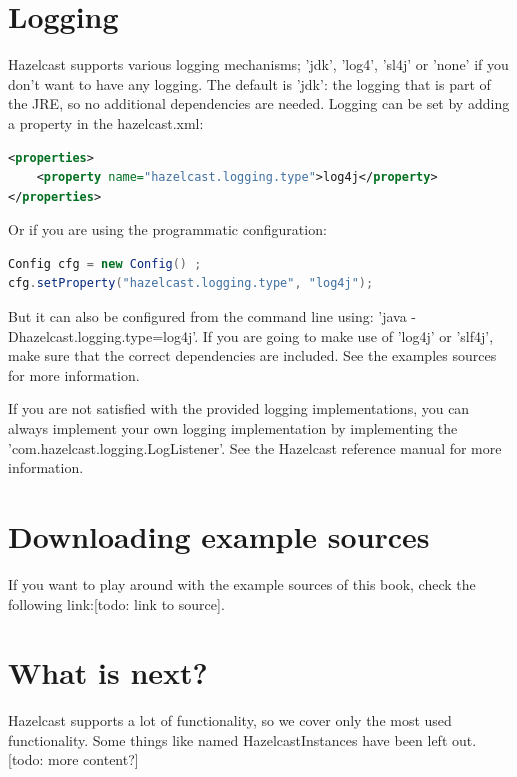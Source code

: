 \section{Logging}
Hazelcast supports various logging mechanisms; 'jdk', 'log4', 'sl4j' or 'none' if you don't want to have any logging. The default is 'jdk': the logging that is part of the JRE, so no additional dependencies are needed. Logging can be set by adding a property in the hazelcast.xml:
\begin{lstlisting}[language=xml]
<properties>
    <property name="hazelcast.logging.type">log4j</property>
</properties>
\end{lstlisting}
Or if you are using the programmatic configuration:
\begin{lstlisting}[language=java]
Config cfg = new Config() ;
cfg.setProperty("hazelcast.logging.type", "log4j");
\end{lstlisting}
But it can also be configured from the command line using: 'java -Dhazelcast.logging.type=log4j'. If you are going to make use of 'log4j' or 'slf4j', make sure that the correct dependencies are included. See the examples sources for more information.

If you are not satisfied with the provided logging implementations, you can always implement your own logging implementation by implementing the 'com.hazelcast.logging.LogListener'. See the Hazelcast reference manual for more information.

\section{Downloading example sources}
If you want to play around with the example sources of this book, check the following link:[todo: link to source]. 

\section{What is next?}
Hazelcast supports a lot of functionality, so we cover only the most used functionality. Some things like named HazelcastInstances have been left out. [todo: more content?]